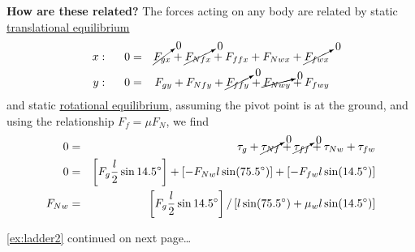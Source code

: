 \documentclass[11pt,letter,openany,makeidx]{book}
\begin{document}
\begin{example}[p]
{\begin{minipage}{4.925in}
\textbf{How are these related?}  The forces acting on any body are related by static \hyperref[ss:transeq]{translational equilibrium}
\begin{eqnarray*}
x: \hspace{.5cm} 0 & = & \cancelto{0}{F_{gx}} + \cancelto{0}{F_{Nfx}} + F_{ffx} + F_{Nwx} + \cancelto{0}{F_{fwx}} \\
y: \hspace{.5cm} 0 & = & F_{gy} + F_{Nfy} + \cancelto{0}{F_{ffy}} + \cancelto{0}{F_{Nwy}} + F_{fwy}
\end{eqnarray*}
and static \hyperref[ss:roteq]{rotational equilibrium}, assuming the pivot point is at the ground, and using the relationship $F_f=\mu F_N$, we find
\begin{eqnarray*}
0 & = & \tau_{g} + \cancelto{0}{\tau_{Nf}} + \cancelto{0}{\tau_{ff}} + \tau_{Nw} + \tau_{fw} \\
0 & = & \left[ F_g \frac{l}{2} \sin 14.5^\circ \right] + \left[ - F_{Nw} l \sin(75.5^\circ) \right] + \left[ - F_{fw} l \sin(14.5^\circ) \right] \\
F_{Nw} & = & \left[ F_g \frac{l}{2} \sin 14.5^\circ \right] / \left[  l \sin(75.5^\circ) + \mu_w l \sin(14.5^\circ) \right]
\end{eqnarray*}


{}\hfill {\footnotesize\autoref*{ex:ladder2} continued on next page\ldots}
\end{minipage}}
\end{example}
\end{document}
